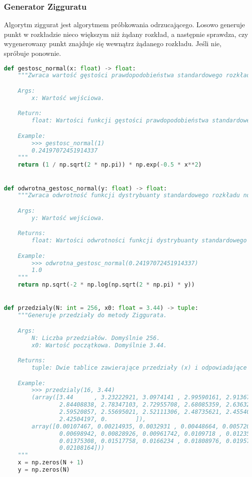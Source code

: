 \documentclass[12pt,letterpaper]{article}
\theoremstyle{definition}
\begin{document}
\subsubsection{Generator Zigguratu}
Algorytm ziggurat jest algorytmem próbkowania odrzucającego. Losowo generuje punkt w rozkładzie nieco większym niż żądany rozkład, a następnie sprawdza, czy wygenerowany punkt znajduje się wewnątrz żądanego rozkładu. Jeśli nie, spróbuje ponownie. 
\begin{lstlisting}[language=Python, caption=Implementacja metody Zigguratu]
def gestosc_normal(x: float) -> float:
    """Zwraca wartość gęstości prawdopodobieństwa standardowego rozkładu normalnego w punkcie x.

    Args:
        x: Wartość wejściowa.

    Return:
        float: Wartości funkcji gęstości prawdopodobieństwa standardowego rozkładu normalnego w punkcie x.

    Example:
        >>> gestosc_normal(1)
        0.24197072451914337
    """
    return (1 / np.sqrt(2 * np.pi)) * np.exp(-0.5 * x**2)


def odwrotna_gestosc_normal(y: float) -> float:
    """Zwraca odwrotność funkcji dystrybuanty standardowego rozkładu normalnego w punkcie y.

    Args:
        y: Wartość wejściowa.

    Returns:
        float: Wartości odwrotności funkcji dystrybuanty standardowego rozkładu normalnego w punkcie y.

    Example:
        >>> odwrotna_gestosc_normal(0.24197072451914337)
        1.0
    """
    return np.sqrt(-2 * np.log(np.sqrt(2 * np.pi) * y))


def przedzialy(N: int = 256, x0: float = 3.44) -> tuple:
    """Generuje przedziały do metody Ziggurata.

    Args:
        N: Liczba przedziałów. Domyślnie 256.
        x0: Wartość początkowa. Domyślnie 3.44.

    Returns:
        tuple: Dwie tablice zawierające przedziały (x) i odpowiadające im gęstości (y).

    Example:
        >>> przedzialy(16, 3.44)
        (array([3.44      , 3.23222921, 3.0974141 , 2.99590161, 2.91367136,
                2.84408838, 2.78347103, 2.72955708, 2.68085359, 2.63632174,
                2.59520857, 2.55695021, 2.52111306, 2.48735621, 2.4554066 ,
                2.42504197, 0.        ]),
        array([0.00107467, 0.00214935, 0.0032931 , 0.00448664, 0.00572062,
                0.00698942, 0.00828926, 0.00961742, 0.0109718 , 0.0123508 ,
                0.01375308, 0.01517758, 0.0166234 , 0.01808976, 0.01957603,
                0.02108164]))
    """
    x = np.zeros(N + 1)
    y = np.zeros(N)


\end{lstlisting}
\end{document}
